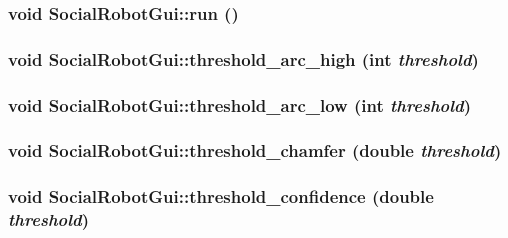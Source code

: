 \label{classSocialRobotGui_aac3a124449c975e2bc69fbc71d891e16}
\hypertarget{classSocialRobotGui_ac9171915901ff625cfbc1492ee8f267e}{
\subsubsection[{run}]{\setlength{\rightskip}{0pt plus 5cm}void SocialRobotGui::run ()}}
\label{classSocialRobotGui_ac9171915901ff625cfbc1492ee8f267e}
\hypertarget{classSocialRobotGui_a5108ee2ec82ffc7561421e5c8576cef4}{
\subsubsection[{threshold\_\-arc\_\-high}]{\setlength{\rightskip}{0pt plus 5cm}void SocialRobotGui::threshold\_\-arc\_\-high (int {\em threshold})}}
\label{classSocialRobotGui_a5108ee2ec82ffc7561421e5c8576cef4}
\hypertarget{classSocialRobotGui_acdabf6f9c428cca8e0c0b74bd9035b82}{
\subsubsection[{threshold\_\-arc\_\-low}]{\setlength{\rightskip}{0pt plus 5cm}void SocialRobotGui::threshold\_\-arc\_\-low (int {\em threshold})}}
\label{classSocialRobotGui_acdabf6f9c428cca8e0c0b74bd9035b82}
\hypertarget{classSocialRobotGui_a35d2e5e74b8e201cb269e8dd3c1b8dab}{
\subsubsection[{threshold\_\-chamfer}]{\setlength{\rightskip}{0pt plus 5cm}void SocialRobotGui::threshold\_\-chamfer (double {\em threshold})}}
\label{classSocialRobotGui_a35d2e5e74b8e201cb269e8dd3c1b8dab}
\hypertarget{classSocialRobotGui_a2345763f68b3da1cff958a9a24218da6}{
\subsubsection[{threshold\_\-confidence}]{\setlength{\rightskip}{0pt plus 5cm}void SocialRobotGui::threshold\_\-confidence (double {\em threshold})}}
